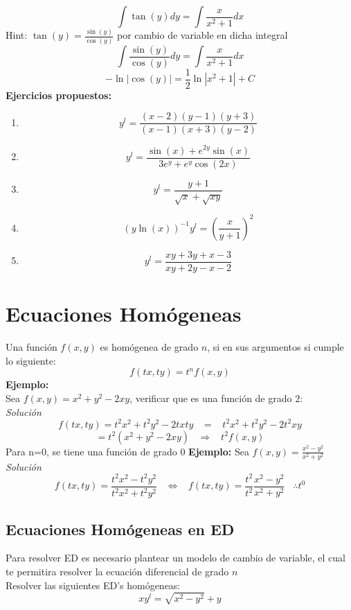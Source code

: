 \documentclass[10pt,executivepaper]{article}
\begin{document}
\[\int \tan(y)dy=\int\frac{x}{x^{2}+1}dx\]
Hint: $\tan(y)=\frac{\sin(y)}{\cos(y)}$ por cambio de variable en dicha integral
\[\int\frac{\sin(y)}{\cos(y)}dy=\int\frac{x}{x^{2}+1}dx\]
\[-\ln\left|\cos(y)\right|=\frac{1}{2}\ln\left|x^{2}+1\right|+C\]
\clearpage
\textbf{Ejercicios propuestos:}
\begin{enumerate}
  \item \[y^{l}=\frac{(x-2)(y-1)(y+3)}{(x-1)(x+3)(y-2)}\]
  \item \[y^{l}=\frac{\sin(x)+e^{2y}\sin(x)}{3e^{y}+e^{y}\cos(2x)}\]
  \item \[y^{l}=\frac{y+1}{\sqrt{x}+\sqrt{xy}}\]
  \item \[\left(y\ln(x)\right)^{-1}y^{l}=\left(\frac{x}{y+1}\right)^{2}\]
  \item \[y^{l}=\frac{xy+3y+x-3}{xy+2y-x-2}\]
\end{enumerate}

\section{Ecuaciones Homógeneas}
Una función $f(x,y)$ es homógenea de grado $n$, si en sus argumentos si cumple lo siguiente:\\
\[f(tx,ty)=t^{n}f(x,y)\]
\textbf{Ejemplo:}
\\Sea $f(x,y)=x^{2}+y^{2}-2xy$, verificar que es una función de grado $2$:\\
\textit{Solución}
\[f(tx,ty)=t^{2}x^{2}+t^{2}y^{2}-2txty\;\;\;=\;\;\;t^{2}x^{2}+t^{2}y^{2}-2t^{2}xy\]
\[=t^{2}(x^{2}+y^{2}-2xy)\;\;\;\Rightarrow\;\;\;t^{2}f(x,y)\]
Para n=0, se tiene una función de grado $0$
\textbf{Ejemplo:}
Sea $f(x,y)=\frac{x^{2}-y^{2}}{x^{2}+y^{2}}$
\textit{Solución}
\[f(tx,ty)=\frac{t^{2}x^{2}-t^{2}y^{2}}{t^{2}x^{2}+t^{2}y^{2}}\;\;\;\Leftrightarrow\;\;\;f(tx,ty)=\frac{t^{2}}{t^{2}}\frac{x^{2}-y^{2}}{x^{2}+y^{2}}\;\;\;\therefore t^{0}\]
\subsection{Ecuaciones Homógeneas en ED}
Para resolver ED es necesario plantear un modelo de cambio de variable, el cual te permitira resolver la ecuación diferencial de grado $n$\\
Resolver las siguientes ED's homógeneas:
\[xy^{l}=\sqrt{x^{2}-y^{2}}+y\]

\printindex
\end{document}
